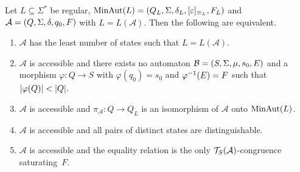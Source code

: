 \begin{theorem}\label{prelim:thm:char_minaut}
	Let $L \subseteq \Sigma^*$ be regular, $\minaut{L} = (Q_L, \Sigma, \delta_L, [\varepsilon]_{\equiv_L}, F_L)$
	and $\automat{A}{Q}{\Sigma}{\delta}{q_0}{F}$ with $L = L(\mathcal A)$.
	Then the following are equivalent.
\begin{enumerate}
	
\item \label{thm:minaut:item:leaststates} $\mathcal A$ has the least number of states such that $L = L(\mathcal A)$.

\item \label{thm:minaut:item:morpism} $\mathcal A$ is accessible and there exists no automaton $\automat{B}{S}{\Sigma}{\mu}{s_0}{E}$
and a morphism $\varphi \colon Q \to S$
with $\varphi(q_0) = s_0$ and $\applyfunc{E}{\varphi^{-1}} = F$
such that $|\applyfunc{Q}{\varphi}| < |Q|$. %

\item \label{thm:minaut:item:piA} $\mathcal A$ is accessible and $\pi_{\mathcal A} \colon Q \to Q_L$ is an isomorphism of $\mathcal A$ onto $\minaut{L}$.

\item \label{thm:minaut:item:statesdist} $\mathcal A$ is accessible and all pairs of distinct states are distinguishable.

\item \label{thm:minaut:item:congruence} $\mathcal A$ is accessible and the equality relation is the only $\TS{\mathcal A}$-congruence 
 saturating~$F$.
 
\end{enumerate}
\end{theorem}
